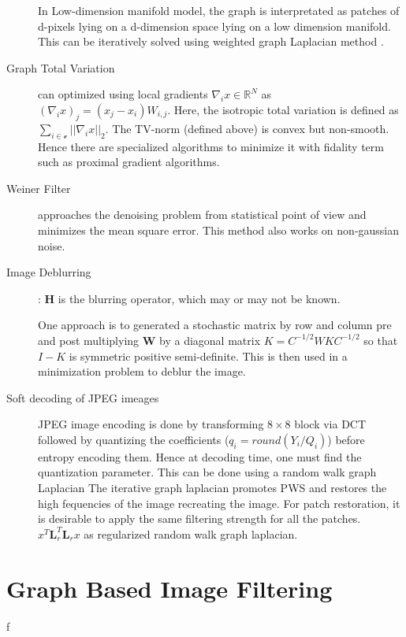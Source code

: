 \documentclass[10pt,a4paper, nocenter]{report}
\begin{document}
\begin{description}
		In Low-dimension manifold model, the graph is interpretated as patches of d-pixels lying on a d-dimension space lying on a low dimension manifold. This can be iteratively solved using weighted graph Laplacian method . 
		
		\item [Graph Total Variation] can optimized using local gradients $\nabla_{i}x \in \mathbb{R}^{N}$ as $(\nabla_{i}x)_{j} = (x_{j}-x_{i})W_{i,j}$. Here, the isotropic total variation is defined as $\sum_{i \in \mathcal{v}}\lvert \lvert \nabla_{i}x \rvert \rvert _{2}$. The TV-norm (defined above) is convex but non-smooth. Hence there are specialized algorithms to minimize it with fidality term  such as proximal gradient algorithms.
		
		\item [Weiner Filter] approaches the denoising problem from statistical point of view and minimizes the mean square error. This method also works on non-gaussian noise.
		
		\item [Image Deblurring]: \textbf{H} is the blurring operator, which may or may not be known. 
		
		One approach is to generated a stochastic matrix by row and column pre and post multiplying \textbf{W} by a diagonal matrix $K=C^{-1/2}WKC^{-1/2}$ so that  $I-K$ is symmetric positive semi-definite. This is then used in a minimization problem to deblur the image. 
		
		
		\item [Soft decoding of JPEG imeages] JPEG image encoding is done by transforming $8\times 8$ block via DCT followed by quantizing the coefficients ($q_{i}=round(Y_{i}/Q_{i})$) before entropy encoding them. Hence at decoding time, one must find the quantization parameter. This can be done using a random walk graph Laplacian The iterative graph laplacian promotes PWS and restores the high fequencies of the image recreating the image. For patch restoration, it is desirable to apply the same filtering strength for all the patches. $x^T\mathbf{L}_{r}^T\mathbf{L}_{r}x$ as regularized random walk graph laplacian. 
	\end{description}
	
	\chapter*{Graph Based Image Filtering}f
	\thispagestyle{fancy}
	
\end{document}
